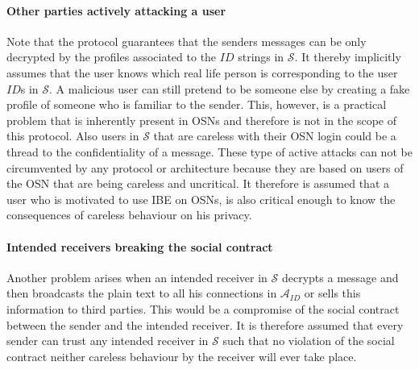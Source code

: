 \documentclass[12pt,openany]{article}
\begin{document}
\paragraph{Other parties actively attacking a user} Note that the protocol
guarantees that the senders messages can be only decrypted by the profiles
associated to the $ID$ strings in $\mathcal{S}$. It thereby implicitly assumes
that the user knows which real life person is corresponding to the user $ID$s in
$\mathcal{S}$. A malicious user can still pretend to be someone else by creating
a fake profile of someone who is familiar to the sender. This, however, is a
practical problem that is inherently present in OSNs and therefore is not in the
scope of this protocol. Also users in $\mathcal{S}$ that are careless with their
OSN login could be a thread to the confidentiality of a message. These type of
active attacks can not be circumvented by any protocol or architecture because
they are based on users of the OSN that are being careless and uncritical. It
therefore is assumed that a user who is motivated to use IBE on OSNs, is also
critical enough to know the consequences of careless behaviour on his privacy.

\paragraph{Intended receivers breaking the social contract} Another problem
arises when an intended receiver in $\mathcal{S}$ decrypts a message and then
broadcasts the plain text to all his connections in $\mathcal{A}_{ID}$ or sells
this information to third parties. This would be a compromise of the social
contract between the sender and the intended receiver. It is therefore assumed
that every sender can trust any intended receiver in $\mathcal{S}$ such that no
violation of the social contract neither careless behaviour by the receiver
will ever take place.
\end{document}

